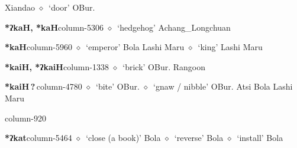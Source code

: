          Xiandao 
\hspace{1ex}
         $\diamond$~`door'
         OBur. 
  \item {\footnotesize \textbf{*ʔkaH, *kaH}}{\tiny column-5306}
         $\diamond$~`hedgehog'
         Achang\_Longchuan 
  \item {\footnotesize \textbf{*kaH}}{\tiny column-5960}
         $\diamond$~`emperor'
         Bola 
\hspace{1ex}
         Lashi 
\hspace{1ex}
         Maru 
\hspace{1ex}
         $\diamond$~`king'
         Lashi 
\hspace{1ex}
         Maru 
  \item {\footnotesize \textbf{*kaiH, *ʔkaiH}}{\tiny column-1338}
         $\diamond$~`brick'
         OBur. 
\hspace{1ex}
         Rangoon 
  \item {\footnotesize \textbf{*kaiH\,?\,}}{\tiny column-4780}
         $\diamond$~`bite'
         OBur. 
\hspace{1ex}
         $\diamond$~`gnaw / nibble'
         OBur. 
\hspace{1ex}
         Atsi 
\hspace{1ex}
         Bola 
\hspace{1ex}
         Lashi 
\hspace{1ex}
         Maru 
  \item {\footnotesize \textbf{}}{\tiny column-920}
  \item {\footnotesize \textbf{*ʔkat}}{\tiny column-5464}
         $\diamond$~`close (a book)'
         Bola 
\hspace{1ex}
         $\diamond$~`reverse'
         Bola 
\hspace{1ex}
         $\diamond$~`install'
         Bola 
